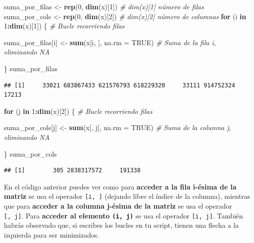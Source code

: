 \documentclass[11pt,]{book}
\newenvironment{Shaded}{\begin{snugshade}}{\end{snugshade}}
\newcommand{\CommentTok}[1]{\textcolor[rgb]{0.37,0.37,0.37}{\textit{#1}}}
\newcommand{\ControlFlowTok}[1]{\textcolor[rgb]{0.27,0.27,0.27}{\textbf{#1}}}
\newcommand{\DataTypeTok}[1]{\textcolor[rgb]{0.27,0.27,0.27}{#1}}
\newcommand{\DecValTok}[1]{\textcolor[rgb]{0.06,0.06,0.06}{#1}}
\newcommand{\KeywordTok}[1]{\textcolor[rgb]{0.27,0.27,0.27}{\textbf{#1}}}
\newcommand{\NormalTok}[1]{#1}
\newcommand{\OperatorTok}[1]{\textcolor[rgb]{0.43,0.43,0.43}{\textbf{#1}}}
\newcommand{\OtherTok}[1]{\textcolor[rgb]{0.37,0.37,0.37}{#1}}
\newcommand{\StringTok}[1]{\textcolor[rgb]{0.5,0.5,0.5}{#1}}
\begin{document}
\begin{Shaded}
\begin{Highlighting}[]
\NormalTok{suma_por_filas <-}\StringTok{ }\KeywordTok{rep}\NormalTok{(}\DecValTok{0}\NormalTok{, }\KeywordTok{dim}\NormalTok{(x)[}\DecValTok{1}\NormalTok{]) }\CommentTok{# dim(x)[1] número de filas}
\NormalTok{suma_por_cols <-}\StringTok{ }\KeywordTok{rep}\NormalTok{(}\DecValTok{0}\NormalTok{, }\KeywordTok{dim}\NormalTok{(x)[}\DecValTok{2}\NormalTok{]) }\CommentTok{# dim(x)[2] número de columnas}
\ControlFlowTok{for}\NormalTok{ (i }\ControlFlowTok{in} \DecValTok{1}\OperatorTok{:}\KeywordTok{dim}\NormalTok{(x)[}\DecValTok{1}\NormalTok{]) \{ }\CommentTok{# Bucle recorriendo filas}

\NormalTok{  suma_por_filas[i] <-}\StringTok{ }\KeywordTok{sum}\NormalTok{(x[i, ], }\DataTypeTok{na.rm =} \OtherTok{TRUE}\NormalTok{) }\CommentTok{# Suma de la fila i, eliminando NA}
    
\NormalTok{\}}
\NormalTok{suma_por_filas}
\end{Highlighting}
\end{Shaded}

\begin{verbatim}
## [1]     33021 683867433 621576793 618229320     33111 914752324     17213
\end{verbatim}

\begin{Shaded}
\begin{Highlighting}[]
\ControlFlowTok{for}\NormalTok{ (j }\ControlFlowTok{in} \DecValTok{1}\OperatorTok{:}\KeywordTok{dim}\NormalTok{(x)[}\DecValTok{2}\NormalTok{]) \{ }\CommentTok{# Bucle recorriendo filas}

\NormalTok{  suma_por_cols[j] <-}\StringTok{ }\KeywordTok{sum}\NormalTok{(x[, j], }\DataTypeTok{na.rm =} \OtherTok{TRUE}\NormalTok{) }\CommentTok{# Suma de la columna j, eliminando NA}
    
\NormalTok{\}}
\NormalTok{suma_por_cols}
\end{Highlighting}
\end{Shaded}

\begin{verbatim}
## [1]        305 2838317572     191338
\end{verbatim}

En el código anterior puedes ver como para \textbf{acceder a la fila i-ésima de la matriz} se usa el operador \texttt{{[}i,\ {]}} (dejando libre el índice de la columna), mientras que para \textbf{acceder a la columna j-ésima de la matriz} se usa el operador \texttt{{[},\ j{]}}. Para \textbf{acceder al elemento \texttt{(i,\ j)}} se usa el operador \texttt{{[}i,\ j{]}}. También habrás observado que, si escribes los bucles en tu script, tienen una flecha a la izquierda para ser minimizados.
\end{document}
